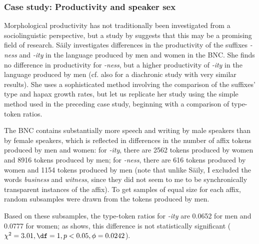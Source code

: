 \subsubsection{Case study: Productivity and speaker sex}
\label{sec:productivityandspeakersex}

Morphological  productivity  has not traditionally been investigated from a sociolinguistic  perspective, but a study by \citet{saily_variation_2011} suggests that this may be a promising field of research. S\"{a}ily investigates differences in the productivity of the suffixes  \textit{-ness} and \textit{-ity} in the language produced by men and women in the BNC.  She finds no difference in productivity for \textit{-ness}, but a higher productivity  of \textit{-ity} in the language produced by men (cf. also \citealt{saily_comparing_2009} for a diachronic  study with very similar results). She uses a sophisticated method involving the comparison of the suffixes'  type  and hapax  growth rates, but let us replicate  her study using the simple method used in the preceding case study, beginning with a comparison of type\hyp{}token  ratios.

The BNC  contains substantially more speech and writing  by male speakers than by female speakers, which is reflected in differences in the number of affix tokens  produced by men and women: for \textit{-ity}, there are \num{2562} tokens produced by women and \num{8916} tokens produced by men; for \textit{-ness}, there are 616 tokens produced by women and \num{1154} tokens produced by men (note that unlike S\"{a}ily, I excluded the words \textit{business} and \textit{witness}, since they did not seem to me to be synchronically transparent instances of the affix).  To get samples of equal size  for each affix,  random subsamples were drawn from the tokens  produced by men.

Based on these subsamples, the type\hyp{}token  ratios for \textit{-ity} are 0.0652 for men and 0.0777 for women; as  shows, this difference is not statistically significant ($\chi^2 = 3.01, \df = 1, p < 0.05, \phi = 0.0242$).

